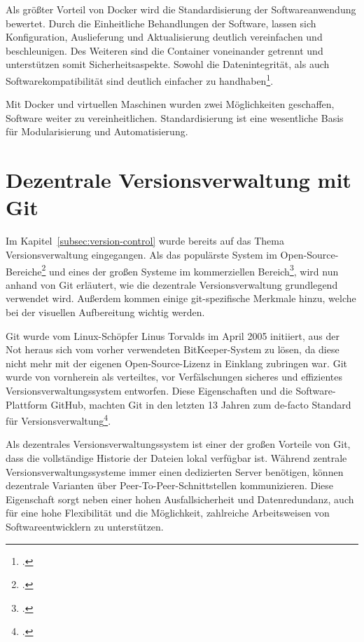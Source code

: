 Als größter Vorteil von Docker wird die Standardisierung der Softwareanwendung bewertet. Durch die Einheitliche Behandlungen der Software, lassen sich Konfiguration, Auslieferung und Aktualisierung deutlich vereinfachen und beschleunigen. Des Weiteren sind die Container voneinander getrennt und unterstützen somit Sicherheitsaspekte. Sowohl die Datenintegrität, als auch Softwarekompatibilität sind deutlich einfacher zu handhaben\footcite[vgl.][]{ten-benefits-docker}.

Mit Docker und virtuellen Maschinen wurden zwei Möglichkeiten geschaffen, Software weiter zu vereinheitlichen. Standardisierung ist eine wesentliche Basis für Modularisierung und Automatisierung.

\section{Dezentrale Versionsverwaltung mit Git}
\label{distributed-vcs-git}

Im Kapitel~\ref{subsec:version-control} \glqq {}\grqq{} wurde bereits auf das Thema Versionsverwaltung 
eingegangen. Als das populärste System im Open-Source-Bereiche\footcite[vgl.][]{openhub-pie-chart} und eines der großen Systeme 
im kommerziellen Bereich\footcite[vgl.][]{g2crowd2018}, wird nun anhand von Git erläutert, wie die dezentrale Versionsverwaltung 
grundlegend verwendet wird. Außerdem kommen einige git-spezifische Merkmale hinzu, welche bei der visuellen Aufbereitung 
wichtig werden.

Git wurde vom Linux-Schöpfer Linus Torvalds im April 2005 initiiert, aus der Not heraus sich vom vorher verwendeten \glqq BitKeeper\grqq{}-System zu lösen, da diese nicht mehr mit der eigenen Open-Source-Lizenz in Einklang zubringen war. Git wurde von vornherein als verteiltes, vor Verfälschungen sicheres und effizientes Versionsverwaltungssystem entworfen. 
Diese Eigenschaften und die Software-Plattform \glqq GitHub\grqq{}, machten Git in den letzten 13 Jahren zum de-facto Standard für Versionsverwaltung\footcite[vgl.][]{heise-torvald-git2015}.

Als dezentrales Versionsverwaltungssystem ist einer der großen Vorteile von Git, dass die vollständige Historie der Dateien lokal verfügbar ist. Während zentrale Versionsverwaltungssysteme immer einen dedizierten Server benötigen, können dezentrale Varianten über Peer-To-Peer-Schnittstellen kommunizieren. Diese Eigenschaft sorgt neben einer hohen Ausfallsicherheit und Datenredundanz, auch für eine hohe Flexibilität und die Möglichkeit, zahlreiche Arbeitsweisen von Softwareentwicklern zu unterstützen.

